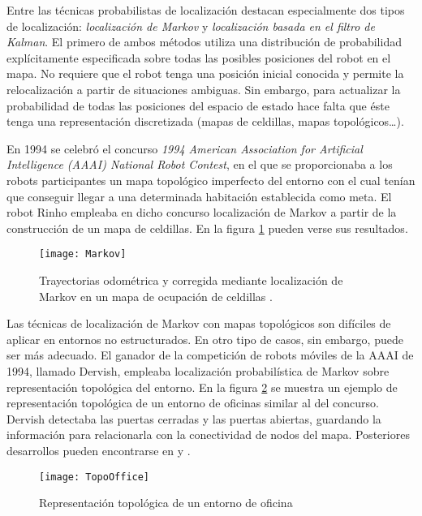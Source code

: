 Entre las técnicas probabilistas de localización destacan especialmente dos tipos de localización: \emph{localización de Markov} y \emph{localización basada en el filtro de Kalman}. El primero de ambos métodos utiliza una distribución de probabilidad explícitamente especificada sobre todas las posibles posiciones del robot en el mapa. No requiere que el robot tenga una posición inicial conocida y permite la relocalización a partir de situaciones ambiguas. Sin embargo, para actualizar la probabilidad de todas las posiciones del espacio de estado hace falta que éste tenga una representación discretizada (mapas de celdillas, mapas topológicos\ldots).

En 1994 se celebró el concurso \emph{1994 American Association for Artificial Intelligence (AAAI) National Robot Contest}, en el que se proporcionaba a los robots participantes un mapa topológico imperfecto del entorno con el cual tenían que conseguir llegar a una determinada habitación establecida como meta. El robot Rinho empleaba en dicho concurso localización de Markov a partir de la construcción de un mapa de celdillas. En la figura \ref{fg:MarkovGrid} pueden verse sus resultados.

\begin{figure}[h]
  \centering\texttt{[image: Markov]}\\
  \caption{ Trayectorias odométrica y corregida mediante localización de Markov en un mapa de ocupación de celdillas \cite{Fox99}.}\label{fg:MarkovGrid}
\end{figure}

Las técnicas de localización de Markov con mapas topológicos son difíciles de aplicar en entornos no estructurados. En otro tipo de casos, sin embargo, puede ser más adecuado. El ganador de la competición de robots móviles de la AAAI de 1994, llamado Dervish, empleaba localización probabilística de Markov sobre representación topológica del entorno. En la figura \ref{fg:MarkovTop} se muestra un ejemplo de representación topológica de un entorno de oficinas similar al del concurso. Dervish detectaba las puertas cerradas y las puertas abiertas, guardando la información para relacionarla con la conectividad de nodos del mapa. Posteriores desarrollos pueden encontrarse en \cite{Simmons95} y \cite{Kaebling96}.

\begin{figure}[h]
  \centering\texttt{[image: TopoOffice]}\\
  \caption{Representación topológica de un entorno de oficina}\label{fg:MarkovTop}
\end{figure}


